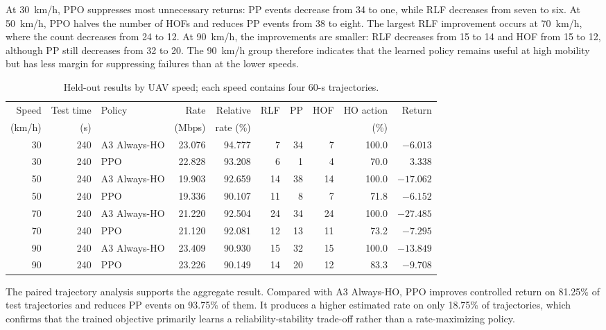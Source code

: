 At 30~km/h, PPO suppresses most unnecessary returns: PP events decrease from
34 to one, while RLF decreases from seven to six. At 50~km/h, PPO halves the
number of HOFs and reduces PP events from 38 to eight. The largest RLF
improvement occurs at 70~km/h, where the count decreases from 24 to 12. At
90~km/h, the improvements are smaller: RLF decreases from 15 to 14 and HOF
from 15 to 12, although PP still decreases from 32 to 20. The 90~km/h group
therefore indicates that the learned policy remains useful at high mobility
but has less margin for suppressing failures than at the lower speeds.

\begin{table}[t]
\centering
\caption{Held-out results by UAV speed; each speed contains four 60-s trajectories.}
\label{tab:results-by-speed}
\begin{tabular}{@{}rrlrrrrrrr@{}}
\toprule
Speed & Test time & Policy & Rate & Relative & RLF & PP & HOF & HO action & Return \\
(km/h) & (s) & & (Mbps) & rate (\%) & & & & (\%) & \\
\midrule
30 & 240 & A3 Always-HO & 23.076 & 94.777 & 7 & 34 & 7 & 100.0 & $-6.013$ \\
30 & 240 & PPO          & 22.828 & 93.208 & 6 & 1  & 4 & 70.0  &  3.338 \\
\midrule
50 & 240 & A3 Always-HO & 19.903 & 92.659 & 14 & 38 & 14 & 100.0 & $-17.062$ \\
50 & 240 & PPO          & 19.336 & 90.107 & 11 & 8  & 7  & 71.8  & $-6.152$ \\
\midrule
70 & 240 & A3 Always-HO & 21.220 & 92.504 & 24 & 34 & 24 & 100.0 & $-27.485$ \\
70 & 240 & PPO          & 21.120 & 92.081 & 12 & 13 & 11 & 73.2  & $-7.295$ \\
\midrule
90 & 240 & A3 Always-HO & 23.409 & 90.930 & 15 & 32 & 15 & 100.0 & $-13.849$ \\
90 & 240 & PPO          & 23.226 & 90.149 & 14 & 20 & 12 & 83.3  & $-9.708$ \\
\bottomrule
\end{tabular}
\end{table}

The paired trajectory analysis supports the aggregate result. Compared with
A3 Always-HO, PPO improves controlled return on 81.25\% of test trajectories
and reduces PP events on 93.75\% of them. It produces a higher estimated rate
on only 18.75\% of trajectories, which confirms that the trained objective
primarily learns a reliability-stability trade-off rather than a rate-maximizing
policy.


